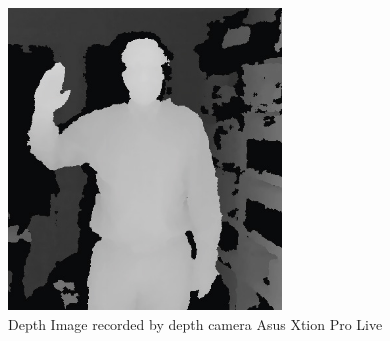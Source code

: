 \begin{figure}
	[h] \centering 
	\includegraphics[height=8cm]{figures/content/xtion-depth.jpg} 	
	\caption{Depth Image recorded by depth camera Asus Xtion Pro Live} \label{fg:xtion:depth} 
\end{figure}
